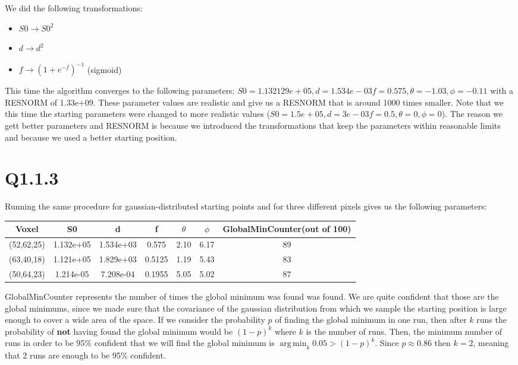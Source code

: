 \documentclass[11pt,a4paper,oneside]{report}
\DeclareMathOperator*{\argmin}{arg\,min}
\begin{document}
We did the following transformations:
\begin{itemize}
 \item $S0 \to S0^2$
 \item $d \to d^2$
 \item $f \to (1+e^{-f})^{-1}$ (sigmoid)
\end{itemize}
This time the algorithm converges to the following parameters: $S0 = 1.132129e+05, d=1.534e-03 f=0.575, \theta=-1.03,  \phi=-0.11$ with a RESNORM of 1.33e+09. These parameter values are realistic and give us a RESNORM that is around 1000 times smaller. Note that we this time the starting parameters were changed to more realistic values ($S0 = 1.5e+05, d=3e-03 f=0.5, \theta=0,  \phi=0$). The reason we gett better parameters and RESNORM is because we introduced the transformations that keep the parameters within reasonable limits and because we used a better starting position.

\section*{Q1.1.3}
Running the same procedure for gaussian-distributed starting points and for three different pixels gives us the following parameters:
\begin{center}
\begin{tabular}{c | c | c | c | c | c | c}
Voxel & S0 & d & f & $\theta$ & $\phi$ & GlobalMinCounter(out of 100)\\
\hline
(52,62,25) & 1.132e+05 & 1.534e+03 & 0.575 & 2.10 & 6.17 & 89\\
(63,40,18) & 1.121e+05 & 1.829e+03 & 0.5125 & 1.19 & 5.43 & 83\\
(50,64,23) & 1.214e-05 & 7.208e-04 & 0.1955 & 5.05 & 5.02 & 87\\
\end{tabular}
\end{center}

GlobalMinCounter represents the number of times the global minimum was found was found. We are quite confident that those are the global minimums, since we made sure that the covariance of the gaussian distribution from which we sample the starting position is large enough to cover a wide area of the space. If we consider the probability $p$ of finding the global minimum in one run, then after $k$ runs the probability of \textbf{not} having found the global minimum would be $(1-p)^k$ where $k$ is the number of runs. Then, the minimum number of runs in order to be 95\% confident that we will find the global minimum is $\argmin_{k} 0.05 > (1-p)^k$. Since $p \approx 0.86$ then $k = 2$, meaning that 2 runs are enough to be 95\% confident.
\end{document}

